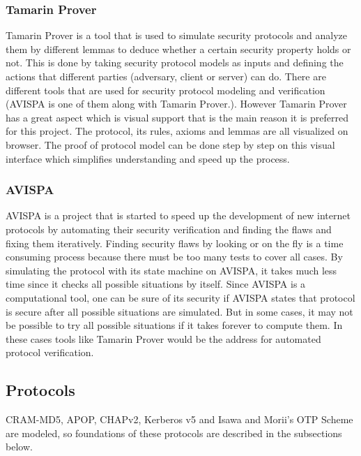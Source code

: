 \documentclass[a4paper, 12pt, titlepage]{article}
\begin{document}
\subsubsection{Tamarin Prover}
Tamarin Prover is a tool that is used to simulate security protocols and analyze them by different lemmas to deduce whether a certain security property holds or not. This is done by taking security protocol models as inputs and defining the actions that different parties (adversary, client or server) can do\cite{manual}. There are different tools that are used for security protocol modeling and verification (AVISPA is one of them along with Tamarin Prover.). However Tamarin Prover has a great aspect which is visual support that is the main reason it is preferred for this project. The protocol, its rules, axioms and lemmas are all visualized on browser. The proof of protocol model can be done step by step on this visual interface which simplifies understanding and speed up the process.
\subsubsection{AVISPA}
AVISPA is a project that is started to speed up the development of new internet protocols by automating their security verification and finding the flaws and fixing them iteratively\cite{avispa}.  Finding security flaws by looking or on the fly is a time consuming process because there must be too many tests to cover all cases. By simulating the protocol with its state machine on AVISPA, it takes much less time since it checks all possible situations by itself. Since AVISPA is a computational tool, one can be sure of its security if AVISPA states that protocol is secure after all possible situations are simulated. But in some cases, it may not be possible to try all possible situations if it takes forever to compute them. In these cases tools like Tamarin Prover would be the address for automated protocol verification.
\subsection{Protocols}
CRAM-MD5, APOP, CHAPv2, Kerberos v5 and Isawa and Morii's OTP Scheme\cite{otparticle} are modeled, so foundations of these protocols are described in the subsections below.
\end{document}
